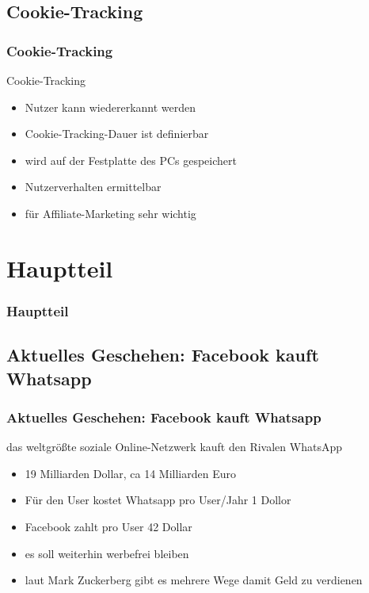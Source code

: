 \documentclass[xcolor=dvipsnames]{beamer}
\begin{document}
\subsection{Cookie-Tracking}
\begin{frame} %
  \frametitle{Cookie-Tracking} %
  \begin{block}{Cookie-Tracking}
	  \begin{itemize}
	  	\item Nutzer kann wiedererkannt werden
		\item Cookie-Tracking-Dauer ist definierbar
		\item wird auf der Festplatte des PCs gespeichert
		\item Nutzerverhalten ermittelbar
		\item für Affiliate-Marketing sehr wichtig
	  \end{itemize}
  \end{block}
\end{frame}


\section{Hauptteil}
\begin{frame} %
  \frametitle{Hauptteil} %
\end{frame}

\subsection{Aktuelles Geschehen: Facebook kauft Whatsapp}
\begin{frame} %
  \frametitle{Aktuelles Geschehen: Facebook kauft Whatsapp} %
  \begin{block}{das weltgrößte soziale Online-Netzwerk kauft den Rivalen WhatsApp}
	  \begin{itemize}
		\item 19 Milliarden Dollar, ca 14 Milliarden Euro
		\item Für den User kostet Whatsapp pro User/Jahr 1 Dollor
		\item Facebook zahlt pro User 42 Dollar
		\item es soll weiterhin werbefrei bleiben
		\item laut Mark Zuckerberg gibt es mehrere Wege damit Geld zu verdienen
	  \end{itemize}
  \end{block}
\end{frame}
\end{document}
